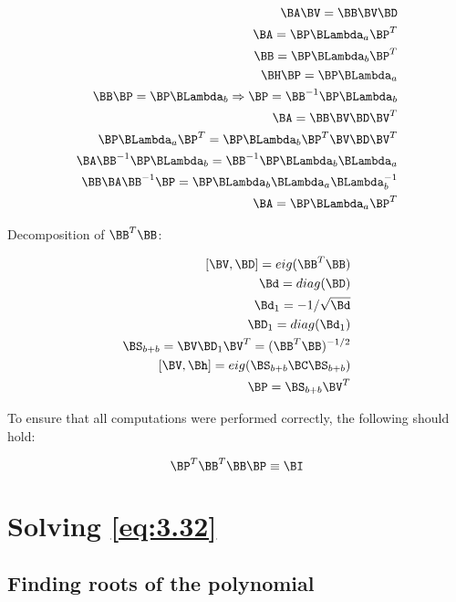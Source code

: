 \begin{eqnarray}
\nonumber
\BA\BV = \BB\BV\BD \\
\nonumber
\BA = \BP\BLambda_a\BP^T \\
\nonumber
\BB = \BP\BLambda_b\BP^T \\
\nonumber
\BH\BP = \BP\BLambda_a \\
\nonumber
\BB\BP = \BP\BLambda_b \Rightarrow \BP = \BB^{-1}\BP\BLambda_b \\
\nonumber
\BA = \BB\BV\BD\BV^T \\
\nonumber
\BP\BLambda_a\BP^T = \BP\BLambda_b\BP^T\BV\BD\BV^T \\
\nonumber
\BA\BB^{-1}\BP\BLambda_b = \BB^{-1}\BP\BLambda_b\BLambda_a \\
\nonumber
\BB\BA\BB^{-1}\BP = \BP\BLambda_b\BLambda_a\BLambda_b^{-1} \\
\nonumber
\BA = \BP\BLambda_a\BP^T
\end{eqnarray}

Decomposition of $\BB^T\BB$:

\begin{eqnarray}
\nonumber
[\BV, \BD] = eig(\BB^T\BB) \\
\nonumber
\Bd = diag(\BD) \\
\nonumber
\Bd_1 = -1/\sqrt{\Bd} \\
\nonumber
\BD_1 = diag(\Bd_1) \\
\nonumber
\BS_{b+b} = \BV\BD_1\BV^T = (\BB^T\BB)^{-1/2} \\
\nonumber
[\BV, \Bh] = eig(\BS_{b+b}\BC\BS_{b+b}) \\
\nonumber
\BP = \BS_{b+b}\BV^T
\end{eqnarray}

To ensure that all computations were performed correctly,
the following should hold:

\begin{equation}
\BP^T\BB^T\BB\BP \equiv \BI
\end{equation}

\section{Solving \ref{eq:3.32}}

\subsection{Finding roots of the polynomial}

